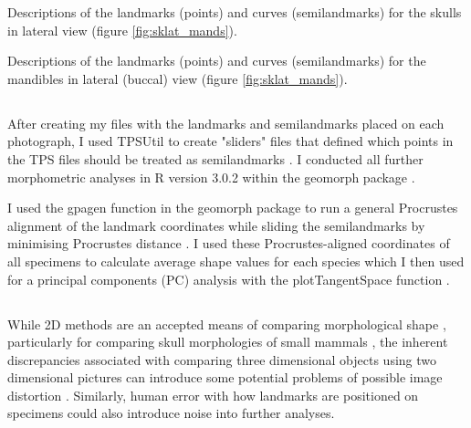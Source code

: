 \begin{table}[!htb]
\caption[Skulls: lateral landmarks]
		{Descriptions of the landmarks (points) and curves (semilandmarks) for the skulls in lateral view (figure \ref{fig:sklat_mands}).} 

\label{tab:sklat}
\end{table}

\begin{table}[!htb]			
	\centering
	\caption[Mandibles: landmarks]
		{Descriptions of the landmarks (points) and curves (semilandmarks) for the mandibles in lateral (buccal) view (figure \ref{fig:sklat_mands}).}
	
	\label{tab:mands} 
\end{table}


\newpage
\subsection{}
\label{sect:procrustes}

	After creating my files with the landmarks and semilandmarks placed on each photograph, I used TPSUtil \citep{Rohlf2012} to create "sliders" files that defined which points in the TPS files should be treated as semilandmarks \citep{Zelditch2012}. I conducted all further morphometric analyses in R version 3.0.2 \citep{Team2014} within the geomorph package \citep{Adams2013}.

	
	I used the gpagen function in the geomorph package \citep{Adams2013} to run a general Procrustes alignment \citep{Rohlf1993} of the landmark coordinates while sliding the semilandmarks by minimising Procrustes distance \citep{Bookstein1997}.
	I used these Procrustes-aligned coordinates of all specimens to calculate average shape values for each species which I then used for a principal components (PC) analysis with the plotTangentSpace function \citep{Adams2013}. 
	

\subsection{}
	 
	While 2D methods are an accepted means of comparing morphological shape \citep[e.g.][]{Adams2004, Mitteroecker2009}, particularly for comparing skull morphologies of small mammals \citep[e.g.][]{Cardini2003, Panchetti2008, White2008, Barrow2008, Scalici2011}, the inherent discrepancies associated with comparing three dimensional objects using two dimensional pictures can introduce some potential problems of possible image distortion \citep{Arnqvist1998}. Similarly, human error with how landmarks are positioned on specimens could also introduce noise into further analyses. 
	
